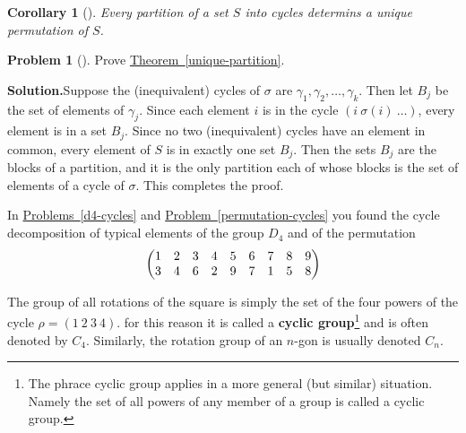 \documentclass[10pt,]{book}
\newcommand{\terminology}[1]{\textbf{#1}}
\theoremstyle{plain}
\newtheorem{corollary}[theorem]{Corollary}
\theoremstyle{definition}
\newtheorem{activity}[project]{Problem}
\theoremstyle{definition}
\numberwithin{equation}{chapter}
\newcommand{\amp}{&}
\begin{document}
\begin{corollary}[{}]\label{corollary-2}
Every partition of a set \(S\) into cycles determins a unique permutation of \(S\).%
\end{corollary}
\begin{activity}[]\label{activity-276}
Prove \hyperref[unique-partition]{Theorem~\ref{unique-partition}}.%
\par\medskip\noindent%
\textbf{Solution.}\quad Suppose the (inequivalent) cycles of \(\sigma\) are \(\gamma_1, \gamma_2,\ldots,\gamma_k\).  Then let \(B_j\) be the set of elements of \(\gamma_j\).  Since each element \(i\) is in the cycle \((i\ \sigma(i)\ \ldots)\), every element is in a set \(B_j\).  Since no two (inequivalent) cycles have an element in common, every element of \(S\) is in exactly one set \(B_j\).  Then the sets \(B_j\) are the blocks of a partition, and it is the only partition each of whose blocks is the set of elements of a cycle of \(\sigma\).  This completes the proof.%
\end{activity}
In \hyperref[d4-cycles]{Problems~\ref{d4-cycles}} and \hyperref[permutation-cycles]{Problem~\ref{permutation-cycles}} you found the cycle decomposition of typical elements of the group \(D_4\) and of the permutation%
\begin{equation*}
\begin{pmatrix}1\amp 2\amp 3\amp 4\amp 5\amp 6\amp 7\amp 8\amp 9\cr
3\amp 4\amp 6\amp 2\amp 9\amp 7\amp 1\amp 5\amp 8
\end{pmatrix}
\end{equation*}
%
\par
The group of all rotations of the square is simply the set of the four powers of the cycle \(\rho = (1\ 2\ 3\ 4)\).  for this reason it is called a \terminology{cyclic group}\footnote{The phrace cyclic group applies in a more general (but similar) situation.  Namely the set of all powers of any member of a group is called a cyclic group.\label{fn-21}} and is often denoted by \(C_4\).  Similarly, the rotation group of an \(n\)-gon is usually denoted \(C_n\).%
\end{document}
